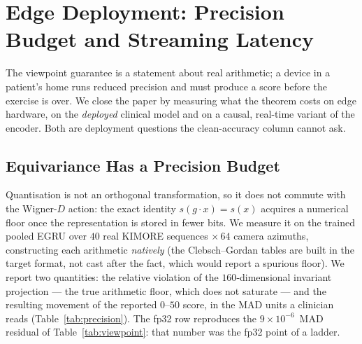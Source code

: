\documentclass[10pt,journal]{IEEEtran}
\begin{document}




\section{Edge Deployment: Precision Budget and Streaming Latency}
\label{sec:deploy}

The viewpoint guarantee is a statement about real arithmetic; a device in a patient's home runs
reduced precision and must produce a score before the exercise is over. We close the paper by
measuring what the theorem costs on edge hardware, on the \emph{deployed} clinical model and on a
causal, real-time variant of the encoder. Both are deployment questions the clean-accuracy column
cannot ask.

\subsection{Equivariance Has a Precision Budget}
\label{sec:deploy:precision}

Quantisation is not an orthogonal transformation, so it does not commute with the Wigner-$D$ action:
the exact identity $s(g\cdot x)=s(x)$ acquires a numerical floor once the representation is stored in
fewer bits. We measure it on the trained pooled EGRU over $40$ real KIMORE sequences $\times\,64$
camera azimuths, constructing each arithmetic \emph{natively} (the Clebsch--Gordan tables are built
in the target format, not cast after the fact, which would report a spurious floor). We report two
quantities: the relative violation of the $160$-dimensional invariant projection --- the true
arithmetic floor, which does not saturate --- and the resulting movement of the reported $0$--$50$
score, in the MAD units a clinician reads (Table~\ref{tab:precision}). The fp32 row reproduces the
$9\times10^{-6}$~MAD residual of Table~\ref{tab:viewpoint}: that number was the fp32 point of a ladder.
\end{document}
